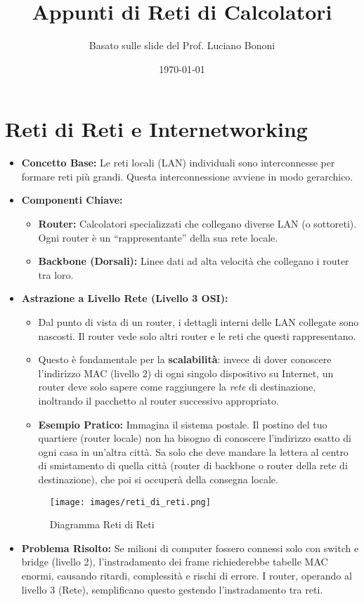 

\title{Appunti di Reti di Calcolatori}
\author{Basato sulle slide del Prof. Luciano Bononi}
\date{\today}



\maketitle
\tableofcontents
\newpage

\section{Reti di Reti e Internetworking}
\begin{itemize}
    \item \textbf{Concetto Base:} Le reti locali (LAN) individuali sono interconnesse per formare reti più grandi. Questa interconnessione avviene in modo gerarchico.
    \item \textbf{Componenti Chiave:}
    \begin{itemize}
        \item \textbf{Router:} Calcolatori specializzati che collegano diverse LAN (o sottoreti). Ogni router è un ``rappresentante'' della sua rete locale.
        \item \textbf{Backbone (Dorsali):} Linee dati ad alta velocità che collegano i router tra loro.
    \end{itemize}
    \item \textbf{Astrazione a Livello Rete (Livello 3 OSI):}
    \begin{itemize}
        \item Dal punto di vista di un router, i dettagli interni delle LAN collegate sono nascosti. Il router vede solo altri router e le reti che questi rappresentano.
        \item Questo è fondamentale per la \textbf{scalabilità}: invece di dover conoscere l'indirizzo MAC (livello 2) di ogni singolo dispositivo su Internet, un router deve solo sapere come raggiungere la \textit{rete} di destinazione, inoltrando il pacchetto al router successivo appropriato.
        \item \textbf{Esempio Pratico:} Immagina il sistema postale. Il postino del tuo quartiere (router locale) non ha bisogno di conoscere l'indirizzo esatto di ogni casa in un'altra città. Sa solo che deve mandare la lettera al centro di smistamento di quella città (router di backbone o router della rete di destinazione), che poi si occuperà della consegna locale.
    \end{itemize}
    \begin{figure}[H]
        \centering
        \texttt{[image: images/reti\_di\_reti.png]}
        \caption{Diagramma Reti di Reti}
    \end{figure}
    \item \textbf{Problema Risolto:} Se milioni di computer fossero connessi solo con switch e bridge (livello 2), l'instradamento dei frame richiederebbe tabelle MAC enormi, causando ritardi, complessità e rischi di errore. I router, operando al livello 3 (Rete), semplificano questo gestendo l'instradamento tra reti.
\end{itemize}

